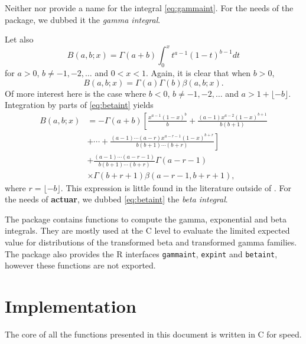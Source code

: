 \documentclass[x11names]{article}
\newcommand{\proglang}[1]{\textsf{#1}}
\newcommand{\pkg}[1]{\textbf{#1}}
\newcommand{\code}[1]{\texttt{#1}}
\begin{document}
Neither \citet{LossModels4e} nor \citet{Abramowitz:1972} provide a
name for the integral \eqref{eq:gammaint}. For the needs of the
package, we dubbed it the \emph{gamma integral}.

Let also
\begin{equation}
  \label{eq:betaint}
  B(a, b; x) = \Gamma(a + b) \int_0^x t^{a-1} (1-t)^{b-1} dt
\end{equation}
for $a > 0$, $b \neq -1, -2, \dots$ and $0 < x < 1$. Again, it is
clear that when $b > 0$,
\begin{equation*}
  B(a, b; x) = \Gamma(a) \Gamma(b) \beta(a, b; x).
\end{equation*}
Of more interest here is the case where $b < 0$,
$b \neq -1, -2, \dots$ and $a > 1 + \lfloor -b\rfloor$. Integration by
parts of \eqref{eq:betaint} yields
\begin{equation*}
  \begin{split}
    B(a, b; x)
    &= \displaystyle
    -\Gamma(a + b) \left[ \frac{x^{a-1} (1-x)^b}{b}
      + \frac{(a-1) x^{a-2} (1-x)^{b+1}}{b (b+1)} \right. \\
    &  \displaystyle\left.
      + \cdots + \frac{(a-1) \cdots (a-r) x^{a-r-1}
        (1-x)^{b+r}}{b (b+1) \cdots (b+r)} \right] \\
    &   \displaystyle
    + \frac{(a-1) \cdots (a-r-1)}{b (b+1) \cdots (b+r)}
    \Gamma(a-r-1) \\
    &  \times \Gamma(b+r+1) \beta(a-r-1, b+r+1),
  \end{split}
\end{equation*}
where $r = \lfloor -b\rfloor$. This expression is little found in the
literature outside of \citet{LossModels4e}. For the needs of
\pkg{actuar}, we dubbed \eqref{eq:betaint} the \emph{beta
  integral}.

The package contains functions to compute the gamma, exponential
and beta integrals. They are mostly used at the \proglang{C} level
to evaluate the limited expected value for distributions of the
transformed beta and transformed gamma families. The package also
provides the R interfaces \code{gammaint}, \code{expint} and
\code{betaint}, however these functions are not exported.


\section{Implementation}
\label{sec:implementation}

The core of all the functions presented in this document is written in
\proglang{C} for speed.
\end{document}
